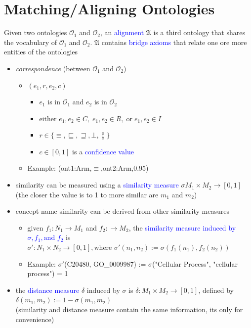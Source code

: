 \documentclass[12pt,a4paper]{article}
\newcommand{\blue}[1]{\textcolor{blue} {#1}}
\newcommand{\ont}{\mathcal{O}}
\newcommand{\sse}{\sqsubseteq}
\begin{document}
\section{Matching/Aligning Ontologies}
Given two ontologies $\ont_1$ and $\ont_2$, an \blue{alignment} $\mathfrak{A}$ is a third ontology that shares the vocabulary of $\ont_1$ and $\ont_2$. $\mathfrak{A}$ contains \blue{bridge axioms} that relate one ore more entities of the ontologies
\begin{itemize}
\item \textit{correspondence} (between $\ont_1$ and $\ont_2$)
\begin{itemize}
\item $(e_1, r, e_2, c)$
\begin{itemize}
\item $e_1$ is in $\ont_1$ and $e_2$ is in $\ont_2$
\item either $e_1, e_2 \in C,\; e_1,e_2\in R,\; \text{or} \; e_1,e_2 \in I$ 
\item $r\in\{\equiv,\sse,\sqsupseteq, \bot, \between\}$
\item $c\in [0,1]$ is a \blue{confidence value}
\end{itemize}
\item Example: (ont1:Arm,$\equiv$,ont2:Arm,0.95)
\end{itemize}
\item similarity can be measured using a \blue{similarity measure} $\sigma M_1 \times M_2 \rightarrow [0,1]$\\(the closer the value is to 1 to more similar are $m_1$ and $m_2$)
\item concept name similarity can be derived from other similarity measures
\begin{itemize}
\item given $f_1: N_1\rightarrow M_1$ and $f_2: \rightarrow M_2$, the \blue{similarity measure induced by $\sigma, f_1, \text{and } f_2$} is $\sigma': N_1 \times N_2 \rightarrow [0,1], \text{where } \sigma'(n_1, n_2) := \sigma(f_1(n_1),f_2(n_2))$
\item Example: $\sigma'$(C20480, GO\_0009987) := $\sigma$("Cellular Process", "cellular process") = 1
\end{itemize}
\item the \blue{distance measure} $\delta$ induced by $\sigma$ is $\delta: M_1 \times M_2 \rightarrow [0,1]$, defined by $\delta(m_1, m_2) := 1-\sigma(m_1, m_2)$\\(similarity and distance measure contain the same information, its only for convenience)

\end{itemize}
\end{document}
